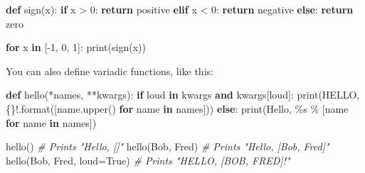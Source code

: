 \documentclass[
]{article}
\newenvironment{Shaded}{}{}
\newcommand{\BuiltInTok}[1]{#1}
\newcommand{\CommentTok}[1]{\textcolor[rgb]{0.38,0.63,0.69}{\textit{#1}}}
\newcommand{\ControlFlowTok}[1]{\textcolor[rgb]{0.00,0.44,0.13}{\textbf{#1}}}
\newcommand{\DecValTok}[1]{\textcolor[rgb]{0.25,0.63,0.44}{#1}}
\newcommand{\KeywordTok}[1]{\textcolor[rgb]{0.00,0.44,0.13}{\textbf{#1}}}
\newcommand{\NormalTok}[1]{#1}
\newcommand{\OperatorTok}[1]{\textcolor[rgb]{0.40,0.40,0.40}{#1}}
\newcommand{\SpecialCharTok}[1]{\textcolor[rgb]{0.25,0.44,0.63}{#1}}
\newcommand{\StringTok}[1]{\textcolor[rgb]{0.25,0.44,0.63}{#1}}
\newcommand{\VariableTok}[1]{\textcolor[rgb]{0.10,0.09,0.49}{#1}}
\begin{document}
\begin{Shaded}
\begin{Highlighting}[]
\KeywordTok{def}\NormalTok{ sign(x):}
    \ControlFlowTok{if}\NormalTok{ x }\OperatorTok{\textgreater{}} \DecValTok{0}\NormalTok{:}
        \ControlFlowTok{return} \StringTok{\textquotesingle{}positive\textquotesingle{}}
    \ControlFlowTok{elif}\NormalTok{ x }\OperatorTok{\textless{}} \DecValTok{0}\NormalTok{:}
        \ControlFlowTok{return} \StringTok{\textquotesingle{}negative\textquotesingle{}}
    \ControlFlowTok{else}\NormalTok{:}
        \ControlFlowTok{return} \StringTok{\textquotesingle{}zero\textquotesingle{}}

\ControlFlowTok{for}\NormalTok{ x }\KeywordTok{in}\NormalTok{ [}\OperatorTok{{-}}\DecValTok{1}\NormalTok{, }\DecValTok{0}\NormalTok{, }\DecValTok{1}\NormalTok{]:}
    \BuiltInTok{print}\NormalTok{(sign(x))}
\end{Highlighting}
\end{Shaded}

You can also define variadic functions, like this:

\begin{Shaded}
\begin{Highlighting}[]
\KeywordTok{def}\NormalTok{ hello(}\OperatorTok{*}\NormalTok{names, }\OperatorTok{**}\NormalTok{kwargs):}
    \ControlFlowTok{if} \StringTok{\textquotesingle{}loud\textquotesingle{}} \KeywordTok{in}\NormalTok{ kwargs }\KeywordTok{and}\NormalTok{ kwargs[}\StringTok{\textquotesingle{}loud\textquotesingle{}}\NormalTok{]:}
        \BuiltInTok{print}\NormalTok{(}\StringTok{\textquotesingle{}HELLO, }\SpecialCharTok{\{\}}\StringTok{!\textquotesingle{}}\NormalTok{.}\BuiltInTok{format}\NormalTok{([name.upper() }\ControlFlowTok{for}\NormalTok{ name }\KeywordTok{in}\NormalTok{ names]))}
    \ControlFlowTok{else}\NormalTok{:}
        \BuiltInTok{print}\NormalTok{(}\StringTok{\textquotesingle{}Hello, }\SpecialCharTok{\%s}\StringTok{\textquotesingle{}} \OperatorTok{\%}\NormalTok{ [name }\ControlFlowTok{for}\NormalTok{ name }\KeywordTok{in}\NormalTok{ names])}

\NormalTok{hello()                          }\CommentTok{\# Prints "Hello, []"}
\NormalTok{hello(}\StringTok{\textquotesingle{}Bob\textquotesingle{}}\NormalTok{, }\StringTok{\textquotesingle{}Fred\textquotesingle{}}\NormalTok{)             }\CommentTok{\# Prints "Hello, [\textquotesingle{}Bob\textquotesingle{}, \textquotesingle{}Fred\textquotesingle{}]"}
\NormalTok{hello(}\StringTok{\textquotesingle{}Bob\textquotesingle{}}\NormalTok{, }\StringTok{\textquotesingle{}Fred\textquotesingle{}}\NormalTok{, loud}\OperatorTok{=}\VariableTok{True}\NormalTok{)  }\CommentTok{\# Prints "HELLO, [\textquotesingle{}BOB\textquotesingle{}, \textquotesingle{}FRED\textquotesingle{}]!"}
\end{Highlighting}
\end{Shaded}
\end{document}
